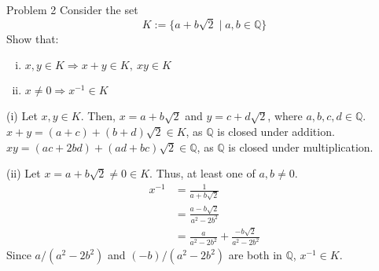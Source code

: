 \documentclass[10pt]{extarticle}
\newcommand{\Q}{\mathbb{Q}}
\begin{document}
  \begin{problem}{Problem 2}
    Consider the set
    \[
      K:= \{a + b\sqrt{2} \mid a,b\in\Q\}
    \] 
    Show that:
    \begin{enumerate}[(i)]
      \item $x,y\in K \Rightarrow x+y\in K,~ xy\in K$
      \item $x\neq 0 \Rightarrow x^{-1}\in K$
    \end{enumerate}
    \tcblower
    \begin{problem}{(i)}
      Let $x,y\in K$. Then, $x = a+b\sqrt{2}$ and $y = c+d\sqrt{2}$, where $a,b,c,d\in \Q$.\\

      $x+y = (a+c) + (b+d)\sqrt{2}\in K$, as $\Q$ is closed under addition.\\

      $xy = (ac + 2bd) + (ad + bc)\sqrt{2}\in\Q$, as $\Q$ is closed under multiplication.
    \end{problem}
    \begin{problem}{(ii)}
      Let $x=a+b\sqrt{2}\neq 0\in K$. Thus, at least one of $a,b\neq 0$.
      \begin{align*}
        x^{-1} &= \frac{1}{a+b\sqrt{2}}\\
               &= \frac{a-b\sqrt{2}}{a^2-2b^2}\\
               &= \frac{a}{a^2-2b^2} + \frac{-b\sqrt{2}}{a^2-2b^2}
      \end{align*}
      Since $a/(a^2 - 2b^2)$ and $(-b)/(a^2-2b^2)$ are both in $\Q$, $x^{-1}\in K$.
    \end{problem}
  \end{problem}
\end{document}
